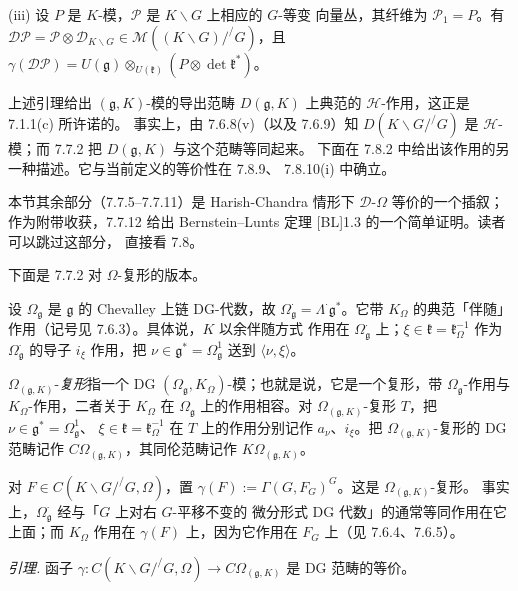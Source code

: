 (iii) 设 $P$ 是 $K$-模，$\mathcal{P}$ 是 $K\backslash G$ 上相应的 $G$-等变
向量丛，其纤维为 $\mathcal{P}_1=P$。有
$\mathcal{D}\mathcal{P}=\mathcal{P}\otimes\mathcal{D}_{K\backslash G}
\in\mathcal{M}((K\backslash G)/^{/}G)$，且
$\gamma(\mathcal{D}\mathcal{P})=U(\mathfrak{g})\otimes_{U(\mathfrak{k})}
(P\otimes\det\mathfrak{k}^*)$。

 上述引理给出 $(\mathfrak{g},K)$-模的导出范畴
$D(\mathfrak{g},K)$ 上典范的 $\mathcal{H}$-作用，这正是 7.1.1(c) 所许诺的。
事实上，由 7.6.8(v)（以及 7.6.9）知 $D(K\backslash G/^{/}G)$ 是
$\mathcal{H}$-模；而 7.7.2 把 $D(\mathfrak{g},K)$ 与这个范畴等同起来。
下面在 7.8.2 中给出该作用的另一种描述。它与当前定义的等价性在 7.8.9、
7.8.10(i) 中确立。


本节其余部分（7.7.5--7.7.11）是 Harish-Chandra 情形下
$\mathcal{D}$-$\Omega$ 等价的一个插叙；作为附带收获，7.7.12 给出
Bernstein--Lunts 定理 [BL]1.3 的一个简单证明。读者可以跳过这部分，
直接看 7.8。

 下面是 7.7.2 对 $\Omega$-复形的版本。

设 $\Omega_{\mathfrak{g}}$ 是 $\mathfrak{g}$ 的 Chevalley 上链 DG-代数，故
$\Omega_{\mathfrak{g}}^{\cdot}=\Lambda^{\cdot}\mathfrak{g}^*$。它带
$K_\Omega$ 的典范「伴随」作用（记号见 7.6.3）。具体说，$K$ 以余伴随方式
作用在 $\Omega_{\mathfrak{g}}^{\cdot}$ 上；$\xi\in\mathfrak{k}
=\mathfrak{k}_\Omega^{-1}$ 作为 $\Omega_{\mathfrak{g}}^{\cdot}$ 的导子
$i_\xi$ 作用，把 $\nu\in\mathfrak{g}^*=\Omega_{\mathfrak{g}}^1$ 送到
$\langle\nu,\xi\rangle$。

$\Omega_{(\mathfrak{g},K)}$-\emph{复形}指一个 DG
$(\Omega_{\mathfrak{g}},K_\Omega)$-模；也就是说，它是一个复形，带
$\Omega_{\mathfrak{g}}$-作用与 $K_\Omega$-作用，二者关于 $K_\Omega$ 在
$\Omega_{\mathfrak{g}}$ 上的作用相容。对 $\Omega_{(\mathfrak{g},K)}$-复形
$T$，把 $\nu\in\mathfrak{g}^*=\Omega_{\mathfrak{g}}^1$、
$\xi\in\mathfrak{k}=\mathfrak{k}_\Omega^{-1}$ 在 $T$ 上的作用分别记作
$a_\nu$、$i_\xi$。把 $\Omega_{(\mathfrak{g},K)}$-复形的 DG 范畴记作
$C\Omega_{(\mathfrak{g},K)}$，其同伦范畴记作
$K\Omega_{(\mathfrak{g},K)}$。

对 $F\in C(K\backslash G/^{/}G,\Omega)$，置
$\gamma(F):=\Gamma(G,F_G)^G$。这是 $\Omega_{(\mathfrak{g},K)}$-复形。
事实上，$\Omega_{\mathfrak{g}}^{\cdot}$ 经与「$G$ 上对右 $G$-平移不变的
微分形式 DG 代数」的通常等同作用在它上面；而 $K_\Omega$ 作用在
$\gamma(F)$ 上，因为它作用在 $F_G$ 上（见 7.6.4、7.6.5）。

 \emph{引理.} 函子
$\gamma:C(K\backslash G/^{/}G,\Omega)\to C\Omega_{(\mathfrak{g},K)}$
是 DG 范畴的等价。

